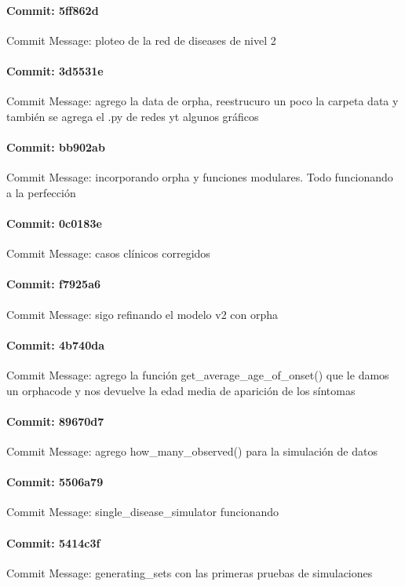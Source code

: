\documentclass{article}
\begin{document}
\paragraph{Commit: 5ff862d}
Commit Message: ploteo de la red de diseases de nivel 2

\paragraph{Commit: 3d5531e}
Commit Message: agrego la data de orpha, reestrucuro un poco la carpeta data y también se agrega el .py de redes yt algunos gráficos

\paragraph{Commit: bb902ab}
Commit Message: incorporando orpha y funciones modulares. Todo funcionando a la perfección

\paragraph{Commit: 0c0183e}
Commit Message: casos clínicos corregidos

\paragraph{Commit: f7925a6}
Commit Message: sigo refinando el modelo v2 con orpha

\paragraph{Commit: 4b740da}
Commit Message: agrego la función get_average_age_of_onset() que le damos un orphacode y nos devuelve la edad media de aparición de los síntomas

\paragraph{Commit: 89670d7}
Commit Message: agrego how_many_observed() para la simulación de datos

\paragraph{Commit: 5506a79}
Commit Message: single_disease_simulator funcionando

\paragraph{Commit: 5414c3f}
Commit Message: generating_sets con las primeras pruebas de simulaciones
\end{document}
